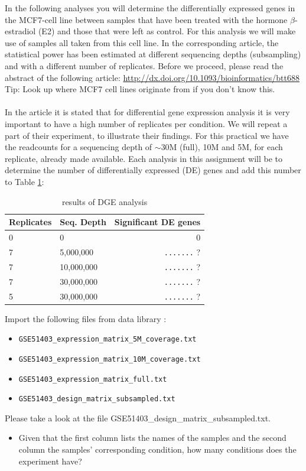 \documentclass[11pt,a4paper]{article}
\begin{document}
In the following analyses you will determine the differentially expressed genes in the MCF7-cell line between samples that have been treated with the hormone $\beta$-estradiol (E2) and those that were left as control. For this analysis we will make use of samples all taken from this cell line. In the corresponding article, the statistical power has been estimated at different sequencing depths (subsampling) and with a different number of replicates. Before we proceed, please read the abstract of the following article:
\url{http://dx.doi.org/10.1093/bioinformatics/btt688}\\
Tip: Look up where MCF7 cell lines originate from if you don't know this.\\
\\
In the article it is stated that for differential gene expression analysis it is very important to have a high number of replicates per condition. We will repeat a part of their experiment, to illustrate their findings. For this practical we have the readcounts for a sequencing depth of $\sim$30M (full), 10M and 5M, for each replicate, already made available. Each analysis in this assignment
will be to determine the number of differentially expressed (DE) genes and add this number to Table \ref{tab:dge_ad_01}:
\begin{table}[]
\centering
\caption{results of DGE analysis}
\label{tab:dge_ad_01}
\begin{tabular}{ | l | l | r | }
\hline
Replicates & Seq. Depth & Significant DE genes \\
\hline
0          & 0          & 0\quad\quad \\
7          & 5,000,000  & \verb|.......| ? \\
7          & 10,000,000 & \verb|.......| ? \\
7          & 30,000,000 & \verb|.......| ? \\
5          & 30,000,000 & \verb|.......| ? \\
\hline
\end{tabular}
\end{table}
Import the following files from data library \datalibrarydirrnaseqadvanced :
\begin{itemize}
	\item[] \verb|GSE51403_expression_matrix_5M_coverage.txt|
	\item[] \verb|GSE51403_expression_matrix_10M_coverage.txt|
	\item[] \verb|GSE51403_expression_matrix_full.txt|
	\item[] \verb|GSE51403_design_matrix_subsampled.txt|
\end{itemize}
Please take a look at the file GSE51403\_design\_matrix\_subsampled.txt.
\begin{itemize}
	\item Given that the first column lists the names of the samples and the second column the samples' corresponding condition, how many conditions does the experiment have?
\end{itemize}

%
%


\vspace{-1.5em}

\end{document}
